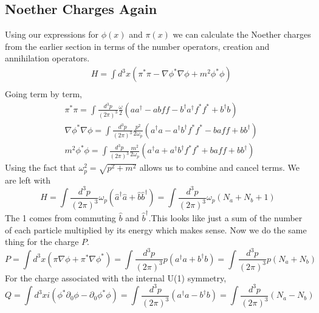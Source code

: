 \documentclass{article}
\numberwithin{equation}{section}
\newcommand{\dpint}{\int \frac{d^3p}{(2\pi)^3}}
\newcommand{\beq}{\begin{equation}}
\newcommand{\eeq}{\end{equation}}
\begin{document}
\subsection{Noether Charges Again}

Using our expressions for $\phi(x)$ and $\pi(x)$ we can calculate the Noether charges from the earlier section in terms of the number operators, creation and annihilation 
operators.
\beq \begin{split}
    &H = \int d^3x \left( \pi^*\pi -\nabla \phi^* \nabla \phi+m^2\phi^*\phi \right) \\
\end{split} \eeq
Going term by term,
\newcommand{\dg}{^\dagger}
\beq \begin{split}
    &\pi^*\pi = \dpint \frac{\omega}{2}(a a\dg -abff-b\dg a\dg f^*f^*+b\dg b)\\
    &\nabla \phi^* \nabla \phi = \dpint \frac{p^2}{2\omega_p}(a\dg a-a\dg b\dg f^*f^*-baff+bb\dg) \\
    &m^2\phi^* \phi = \dpint \frac{m^2}{2\omega_p}(a\dg a +a\dg b\dg f^*f^*+baff+bb\dg)
\end{split} \eeq
Using the fact that $\omega^2_p = \sqrt{p^2+m^2}$ allows us to combine and cancel terms. We are left with
\beq
    H = \dpint \omega_p(\hat{a}\dg \hat{a} + \hat{b} \hat{b}\dg) = \dpint \omega_p(N_a+N_b+1)
\eeq
The 1 comes from commuting $\hat{b}$ and $\hat{b}\dg$.This looks like just a sum of the number of each particle multiplied by its energy which makes sense.
Now we do the same thing for the charge $P$.
\beq
    P = \int d^3x(\pi\nabla\phi + \pi^*\nabla\phi^*) = \dpint p(a\dg a + b\dg b) = \dpint p(N_a+N_b)
\eeq
For the charge associated with the internal U(1) symmetry,
\beq
    Q = \int d^3x i(\phi^* \partial_0 \phi - \partial_0 \phi^* \phi) = \dpint (a\dg a - b\dg b) = \dpint (N_a - N_b)
\eeq
\end{document}
